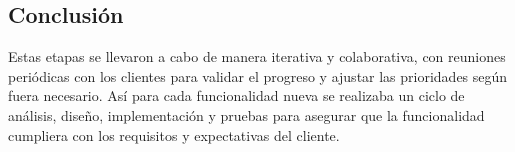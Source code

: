 \subsection{Conclusión}	  
Estas etapas se llevaron a cabo de manera iterativa y colaborativa, con reuniones periódicas
con los clientes para validar el progreso y ajustar las prioridades según fuera necesario.
Así para cada funcionalidad nueva se realizaba un ciclo de análisis, diseño, implementación y pruebas
para asegurar que la funcionalidad cumpliera con los requisitos y expectativas del cliente.